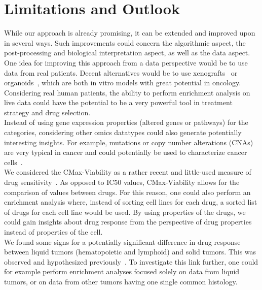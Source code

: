 \section{Limitations and Outlook}\label{outlook}
While our approach is already promising, it can be extended and improved upon in several ways. Such improvements could concern the algorithmic aspect, the post-processing and biological interpretation aspect, as well as the data aspect.\\
One idea for improving this approach from a data perspective would be to use data from real patients. Decent alternatives would be to use xenografts~\cite{xenograft} or organoids~\cite{organoid}, which are both in vitro models with great potential in oncology. Considering real human patients, the ability to perform enrichment analysis on live data could have the potential to be a very powerful tool in treatment strategy and drug selection.\\
Instead of using gene expression properties (altered genes or pathways) for the categories, considering other omics datatypes could also generate potentially interesting insights. For example, mutations or copy number alterations (CNAs) are very typical in cancer and could potentially be used to characterize cancer cells~\cite{hallmarks-of-cancer}.\\
We considered the CMax-Viability as a rather recent and little-used measure of drug sensitivity~\cite{cmax_viability}. As opposed to IC50 values, CMax-Viability allows for the comparison of values between drugs. For this reason, one could also perform an enrichment analysis where, instead of sorting cell lines for each drug, a sorted list of drugs for each cell line would be used. By using properties of the drugs, we could gain insights about drug response from the perspective of drug properties instead of properties of the cell.\\
We found some signs for a potentially significant difference in drug response between liquid tumors (hematopoietic and lymphoid) and solid tumors. This was observed and hypothesized previously~\cite{fluid_solid_tumors_sensitivity, tissue_specificity_of_in_vitro_drug_sensitivity}. To investigate this link further, one could for example perform enrichment analyses focused solely on data from liquid tumors, or on data from other tumors having one single common histology.\\
